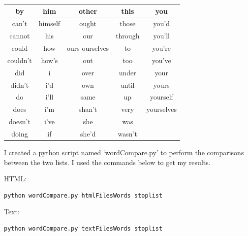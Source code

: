 \documentclass[12pt]{article}
\begin{document}
\begin{longtable}{|c|c|c|c|c|}
    \hline
    by & him & other & this & you\\
    \hline
    can't & himself & ought & those & you'd\\
    \hline
    cannot & his & our & through & you'll\\
    \hline
    could & how & ours    ourselves & to & you're\\
    \hline
    couldn't & how's & out & too & you've\\
    \hline
    did & i & over & under & your\\
    \hline
    didn't & i'd & own & until & yours\\
    \hline
    do & i'll & same & up & yourself\\
    \hline
    does & i'm & shan't & very & yourselves\\
    \hline
    doesn't & i've & she & was & \\
    \hline
    doing & if & she'd & wasn't & \\
    \hline
\end{longtable}

I created a python script named `wordCompare.py' to perform the comparisons between the two lists. I used the commands below to get my results.

HTML:\\
\begin{lstlisting}[language=bash]
    python wordCompare.py htmlFilesWords stoplist
\end{lstlisting}

Text: \\
\begin{lstlisting}[language=bash]
    python wordCompare.py textFilesWords stoplist
\end{lstlisting}
\end{document}
